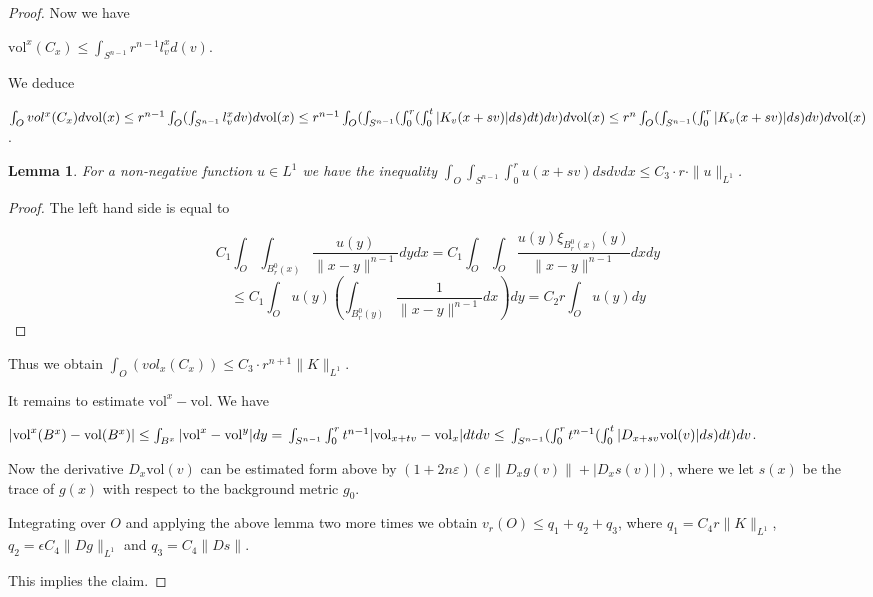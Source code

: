 \documentclass[12pt,leqno]{amsart}
\numberwithin{equation}{section}
\newtheorem{lem}[thm]{Lemma}
\theoremstyle{definition}
\theoremstyle{remark}
\newcommand{\vol}{\mathrm{vol}}
\def\eps{\varepsilon}
\begin{document}
\begin{proof}
   Now we have

   $\vol ^x (C_x) \leq \int _{S^{n-1}} r^{n-1} l^x _v d(v) $.


    We deduce

    $\int _O vol ^x (C_x) d\vol (x) \leq r^{n-1} \int _O (\int _{S^{n-1}} l_v ^x dv) d\vol (x) \leq \\
    r^{n-1} \int _O (\int _{S^{n-1}} (\int _0 ^r (\int _0 ^t |K_v (x+sv)| ds)dt)dv)d\vol (x) \leq \\
    r^n \int _O (\int _{S^{n-1}} (\int _0 ^r |K_v (x+sv)| ds) dv)d\vol (x)$.


    \begin{lem}
    For a non-negative function $u\in L^1$ we have the inequality
    $\int _O \int _{S^{n-1}} \int _0^r u(x+sv) ds dv dx \leq C_3 \cdot r \cdot \|u\| _{L^1}$.
    \end{lem}


     \begin{proof}
     The left hand side is equal to

     \[
     C_1 \int _O \int_{B^0_r (x)} \frac {u(y)}  {\|x-y\| ^{n-1}} dy dx = C_1 \int _O \int _O \frac {u(y) \xi _{B^0_r (x)}(y)}
     {\|x-y\| ^{n-1}} dx dy 
     \]
     \[
    \le C_1 \int _O u(y)\left(\int _{B_r^0(y)}  \frac {1}
     {\|x-y\| ^{n-1}} dx\right)dy = C_2 r  \int _O u(y)dy
     \]
     \end{proof}


      Thus we obtain $\int _O (vol _x (C_x)) \leq C_3 \cdot r^{n+1} \|K\| _{L^1}$.


      It remains to estimate $\vol ^x - \vol$. We have

      $|\vol ^x (B^x) -\vol (B^x)| \leq \int _ {B^x} |\vol ^x -\vol ^y| dy = \\
      \int _{S^{n-1}} \int _0 ^r  t^{n-1} | \vol _{x+tv} - \vol _x| dt dv \leq  \\
       \int _{ S^{n-1}} (\int _0 ^r t^{n-1} (\int _0 ^t  |D_{x+sv} \vol (v)| ds) dt) dv$.

      Now the derivative $D_x \vol (v)$ can be estimated form above by $(1+2n\eps)(\eps \|D_xg (v)\| + | D_x s (v)|)$,
      where we let $s(x)$ be the trace of $g(x)$ with respect to the background metric $g_0$.

      Integrating over $O$ and applying the above lemma two more times we obtain
      $v_r (O) \leq q_1 +q_2 +q_3$, where
      $q_1 = C_4 r \|K\| _{L^1}$, $q_2 = \epsilon C_4 \| Dg\| _{L^1} $ and $q_3 = C_4 \|Ds\|$.

      This implies the claim.
    \end{proof}
\end{document}

